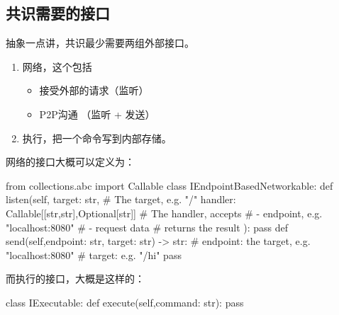 \documentclass[dvipsnames]{ctexart}
\begin{document}
\subsection{共识需要的接口}
抽象一点讲，共识最少需要两组外部接口。
\begin{enumerate}
\item 网络，这个包括
  \begin{itemize}
  \item 接受外部的请求（监听）
  \item P2P沟通 （监听 + 发送）
  \end{itemize}
\item 执行，把一个命令写到内部存储。
\end{enumerate}
网络的接口大概可以定义为：
\begin{simplepy}
from collections.abc import Callable
class IEndpointBasedNetworkable:
    def listen(self,
               target: str,     # The target, e.g. "/"
               handler: Callable[[str,str],Optional[str]]
               # The handler, accepts
               #  - endpoint, e.g. "localhost:8080"
               #  - request data
               # returns the result
               ):
        pass
    def send(self,endpoint: str, target: str) -> str:
        # endpoint: the target, e.g. "localhost:8080"
        # target: e.g. "/hi"
        pass
\end{simplepy}
而执行的接口，大概是这样的：
\begin{simplepy}
class IExecutable:
    def execute(self,command: str):
        pass
\end{simplepy}
\end{document}
